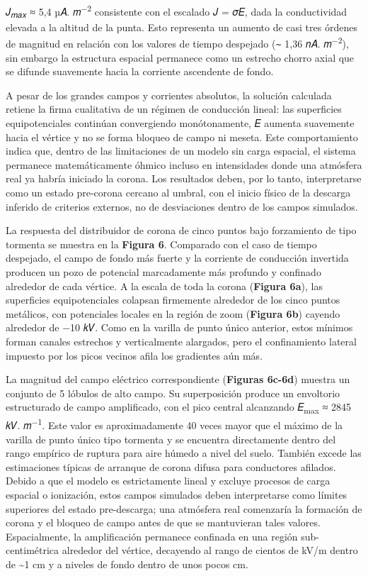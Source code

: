 \documentclass[
]{article}
\begin{document}
𝐽\textsubscript{𝑚𝑎𝑥} ≈ 5,4 µ𝐴. 𝑚\textsuperscript{−2} consistente con el
escalado 𝐽 = 𝜎𝐸, dada la conductividad elevada a la altitud de la punta.
Esto representa un aumento de casi tres órdenes de magnitud en relación
con los valores de tiempo despejado (∼ 1,36 𝑛𝐴. 𝑚\textsuperscript{−2}),
sin embargo la estructura espacial permanece como un estrecho chorro
axial que se difunde suavemente hacia la corriente ascendente de fondo.

A pesar de los grandes campos y corrientes absolutos, la solución
calculada retiene la firma cualitativa de un régimen de conducción
lineal: las superficies equipotenciales continúan convergiendo
monótonamente, \textbar 𝐸\textbar{} aumenta suavemente hacia el vértice
y no se forma bloqueo de campo ni meseta. Este comportamiento indica
que, dentro de las limitaciones de un modelo sin carga espacial, el
sistema permanece matemáticamente óhmico incluso en intensidades donde
una atmósfera real ya habría iniciado la corona. Los resultados deben,
por lo tanto, interpretarse como un estado pre-corona cercano al umbral,
con el inicio físico de la descarga inferido de criterios externos, no
de desviaciones dentro de los campos simulados.

La respuesta del distribuidor de corona de cinco puntos bajo forzamiento
de tipo tormenta se muestra en la \textbf{Figura 6}. Comparado con el
caso de tiempo despejado, el campo de fondo más fuerte y la corriente de
conducción invertida producen un pozo de potencial marcadamente más
profundo y confinado alrededor de cada vértice. A la escala de toda la
corona (\textbf{Figura 6a}), las superficies equipotenciales colapsan
firmemente alrededor de los cinco puntos metálicos, con potenciales
locales en la región de zoom (\textbf{Figura 6b}) cayendo alrededor de
−10 𝑘𝑉. Como en la varilla de punto único anterior, estos mínimos forman
canales estrechos y verticalmente alargados, pero el confinamiento
lateral impuesto por los picos vecinos afila los gradientes aún más.

La magnitud del campo eléctrico correspondiente (\textbf{Figuras 6c-6d})
muestra un conjunto de 5 lóbulos de alto campo. Su superposición produce
un envoltorio estructurado de campo amplificado, con el pico central
alcanzando 𝐸\textsubscript{max} ≈ 2845 𝑘𝑉. 𝑚\textsuperscript{−1}. Este
valor es aproximadamente 40 veces mayor que el máximo de la varilla de
punto único tipo tormenta y se encuentra directamente dentro del rango
empírico de ruptura para aire húmedo a nivel del suelo. También excede
las estimaciones típicas de arranque de corona difusa para conductores
afilados. Debido a que el modelo es estrictamente lineal y excluye
procesos de carga espacial o ionización, estos campos simulados deben
interpretarse como límites superiores del estado pre-descarga; una
atmósfera real comenzaría la formación de corona y el bloqueo de campo
antes de que se mantuvieran tales valores. Espacialmente, la
amplificación permanece confinada en una región sub-centimétrica
alrededor del vértice, decayendo al rango de cientos de kV/m dentro de
\textasciitilde1 cm y a niveles de fondo dentro de unos pocos cm.
\end{document}
